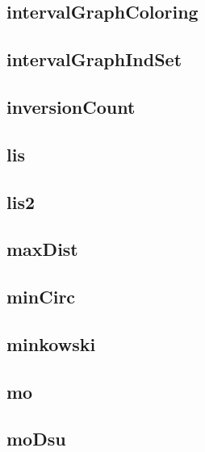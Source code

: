 \subsection{intervalGraphColoring}
\raggedbottom
\hrulefill
\subsection{intervalGraphIndSet}
\raggedbottom
\hrulefill
\subsection{inversionCount}
\raggedbottom
\hrulefill
\subsection{lis}
\raggedbottom
\hrulefill
\subsection{lis2}
\raggedbottom
\hrulefill
\subsection{maxDist}
\raggedbottom
\hrulefill
\subsection{minCirc}
\raggedbottom
\hrulefill
\subsection{minkowski}
\raggedbottom
\hrulefill
\subsection{mo}
\raggedbottom
\hrulefill
\subsection{moDsu}
\raggedbottom
\hrulefill
